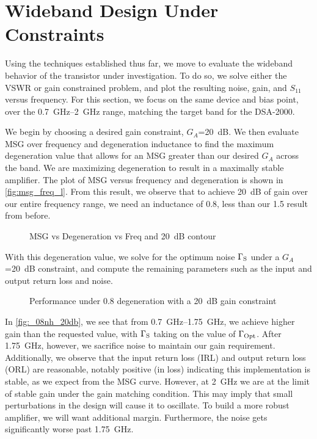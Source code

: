 \section{Wideband Design Under Constraints}

Using the techniques established thus far, we move to evaluate the wideband behavior of the transistor under investigation.
To do so, we solve either the VSWR or gain constrained problem, and plot the resulting noise, gain, and $S_{11}$ versus frequency.
For this section, we focus on the same device and bias point, over the \SIrange{0.7}{2}{\GHz} range, matching the target band for the DSA-2000.

We begin by choosing a desired gain constraint, $G_A$\qty{=20}{\dB}.
We then evaluate MSG over frequency and degeneration inductance to find the maximum degeneration value that allows for an MSG greater than our desired $G_A$ across the band.
We are maximizing degeneration to result in a maximally stable amplifier.
The plot of MSG versus frequency and degeneration is shown in \autoref{fig:msg_freq_l}.
From this result, we observe that to achieve \qty{20}{\dB} of gain over our entire frequency range, we need an inductance of \qty{0.8}{\nH}, less than our \qty{1.5}{\nH} result from before.
%
\begin{figure}[ht!]
    \centering
     
    \caption[MSG vs Degeneration vs Freq]{MSG vs Degeneration vs Freq and \qty{20}{\dB} contour}
    \label{fig:msg_freq_l}
\end{figure}

With this degeneration value, we solve for the optimum noise $\Gamma_{\text{S}}$ under a $G_A$\qty{=20}{\dB} constraint, and compute the remaining parameters such as the input and output return loss and noise.
%
\begin{figure}[ht!]
    \centering
     
    \caption{Performance under \qty{0.8}{\nH} degeneration with a \qty{20}{\dB} gain constraint}
    \label{fig:_08nh_20db}
\end{figure}

In \autoref{fig:_08nh_20db}, we see that from \SIrange{0.7}{1.75}{\GHz}, we achieve higher gain than the requested value, with $\Gamma_{\text{S}}$ taking on the value of $\Gamma_{\text{Opt}}$.
After \qty{1.75}{\GHz}, however, we sacrifice noise to maintain our gain requirement.
Additionally, we observe that the input return loss (IRL) and output return loss (ORL) are reasonable, notably positive (in loss) indicating this implementation is stable, as we expect from the MSG curve.
However, at \qty{2}{\GHz} we are at the limit of stable gain under the gain matching condition.
This may imply that small perturbations in the design will cause it to oscillate.
To build a more robust amplifier, we will want additional margin.
Furthermore, the noise gets significantly worse past \qty{1.75}{\GHz}.

